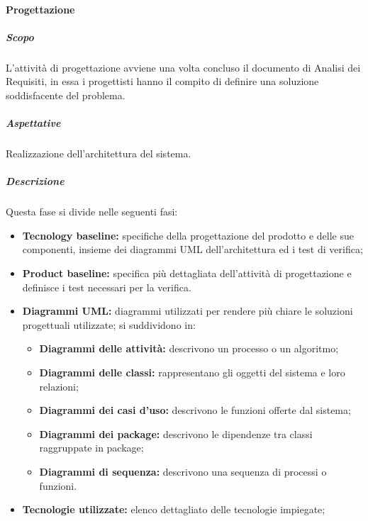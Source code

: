 			\paragraph {Progettazione}
				\subparagraph{Scopo}
					L'attività di progettazione avviene una volta concluso il documento di Analisi dei Requisiti, in essa i progettisti hanno il compito di definire una soluzione soddisfacente del problema.
				\subparagraph{Aspettative}
					Realizzazione dell'architettura del sistema.
				\subparagraph{Descrizione}
					Questa fase si divide nelle seguenti fasi: 
					\begin{itemize}
						\item \textbf{Tecnology baseline:} specifiche della progettazione del prodotto e delle sue componenti, insieme dei diagrammi UML dell'architettura ed i test di verifica;
						\item \textbf{Product baseline:} specifica più dettagliata dell'attività di progettazione e definisce i test necessari per la verifica. 
						\item \textbf{Diagrammi UML:} diagrammi utilizzati per rendere più chiare le soluzioni progettuali utilizzate; si suddividono in:	
						\begin{itemize}
							\item \textbf{Diagrammi delle attività:} descrivono un processo o un algoritmo;
							\item \textbf{Diagrammi delle classi:} rappresentano gli oggetti del sistema e loro relazioni;
							\item \textbf{Diagrammi dei casi d'uso:} descrivono le funzioni offerte dal sistema;
							\item \textbf{Diagrammi dei package:} descrivono le dipendenze tra classi raggruppate in package;
							\item \textbf{Diagrammi di sequenza:} descrivono una sequenza di processi o funzioni.
						\end{itemize}
						\item \textbf{Tecnologie utilizzate:} elenco dettagliato delle tecnologie impiegate; 
						\end{itemize}	
				
